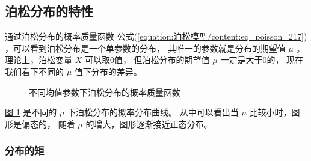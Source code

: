 \documentclass[letterpaper,10pt,english]{sphinxmanual}
\begin{document}
\subsection{泊松分布的特性}
\label{\detokenize{_u6cca_u677e_u6a21_u578b/content:id3}}
通过泊松分布的概率质量函数 公式(\ref{equation:泊松模型/content:eq_poisson_217}) ，可以看到泊松分布是一个单参数的分布，
其唯一的参数就是分布的期望值 \(\mu\) 。
理论上，泊松变量 \(X\) 可以取0值，
但泊松分布的期望值 \(\mu\) 一定是大于0的，
现在我们看下不同的 \(\mu\) 值下分布的差异。

\begin{figure}[htbp]
\centering
\capstart

\noindent{}
\caption{不同均值参数下泊松分布的概率质量函数}\label{\detokenize{_u6cca_u677e_u6a21_u578b/content:id10}}\label{\detokenize{_u6cca_u677e_u6a21_u578b/content:fg-poisson-002}}\end{figure}

\hyperref[\detokenize{_u6cca_u677e_u6a21_u578b/content:fg-poisson-002}]{图 \ref{\detokenize{_u6cca_u677e_u6a21_u578b/content:fg-poisson-002}}} 是不同的 \(\mu\) 下泊松分布的概率分布曲线。
从中可以看出当 \(\mu\) 比较小时，图形是偏态的，
随着 \(\mu\) 的增大，图形逐渐接近正态分布。


\subsubsection{分布的矩}
\label{\detokenize{_u6cca_u677e_u6a21_u578b/content:id4}}
\end{document}
